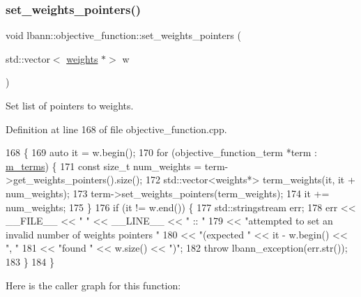 \subsubsection{\texorpdfstring{set\+\_\+weights\+\_\+pointers()}{set\_weights\_pointers()}}
{\footnotesize\ttfamily void lbann\+::objective\+\_\+function\+::set\+\_\+weights\+\_\+pointers (\begin{DoxyParamCaption}\item[{std\+::vector$<$ \hyperlink{classlbann_1_1weights}{weights} $\ast$$>$}]{w }\end{DoxyParamCaption})}

Set list of pointers to weights. 

Definition at line 168 of file objective\+\_\+function.\+cpp.


\begin{DoxyCode}
168                                                                    \{
169   \textcolor{keyword}{auto} it = w.begin();
170   \textcolor{keywordflow}{for} (objective\_function\_term *term : \hyperlink{classlbann_1_1objective__function_aea9c1f90ba9af1b1330efa2ba6adb5e2}{m\_terms}) \{
171     \textcolor{keyword}{const} \textcolor{keywordtype}{size\_t} num\_weights = term->get\_weights\_pointers().size();
172     std::vector<weights*> term\_weights(it, it + num\_weights);
173     term->set\_weights\_pointers(term\_weights);
174     it += num\_weights;
175   \}
176   \textcolor{keywordflow}{if} (it != w.end()) \{
177     std::stringstream err;
178     err << \_\_FILE\_\_ << \textcolor{stringliteral}{" "} << \_\_LINE\_\_ << \textcolor{stringliteral}{" :: "}
179         << \textcolor{stringliteral}{"attempted to set an invalid number of weights pointers "}
180         << \textcolor{stringliteral}{"(expected "} << it - w.begin() << \textcolor{stringliteral}{", "}
181         << \textcolor{stringliteral}{"found "} << w.size() << \textcolor{stringliteral}{")"};
182     \textcolor{keywordflow}{throw} lbann\_exception(err.str());
183   \}
184 \}
\end{DoxyCode}
Here is the caller graph for this function\+:\nopagebreak
